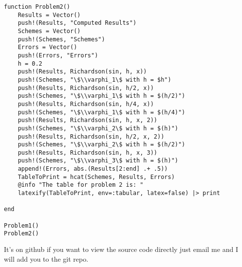 \documentclass[]{article}
\begin{document}
\begin{verbatim}
function Problem2()
    Results = Vector()
    push!(Results, "Computed Results")
    Schemes = Vector()
    push!(Schemes, "Schemes")
    Errors = Vector()
    push!(Errors, "Errors")
    h = 0.2
    push!(Results, Richardson(sin, h, x))
    push!(Schemes, "\$\\varphi_1\$ with h = $h")
    push!(Results, Richardson(sin, h/2, x))
    push!(Schemes, "\$\\varphi_1\$ with h = $(h/2)")
    push!(Results, Richardson(sin, h/4, x))
    push!(Schemes, "\$\\varphi_1\$ with h = $(h/4)")
    push!(Results, Richardson(sin, h, x, 2))
    push!(Schemes, "\$\\varphi_2\$ with h = $(h)")
    push!(Results, Richardson(sin, h/2, x, 2))
    push!(Schemes, "\$\\varphi_2\$ with h = $(h/2)")
    push!(Results, Richardson(sin, h, x, 3))
    push!(Schemes, "\$\\varphi_3\$ with h = $(h)")
    append!(Errors, abs.(Results[2:end] .+ .5))
    TableToPrint = hcat(Schemes, Results, Errors) 
    @info "The table for problem 2 is: "
    latexify(TableToPrint, env=:tabular, latex=false) |> print
    
end

Problem1()
Problem2()

\end{verbatim}

It's on github if you want to view the source code directly just email me and I will add you to the git repo.  
\end{document}
